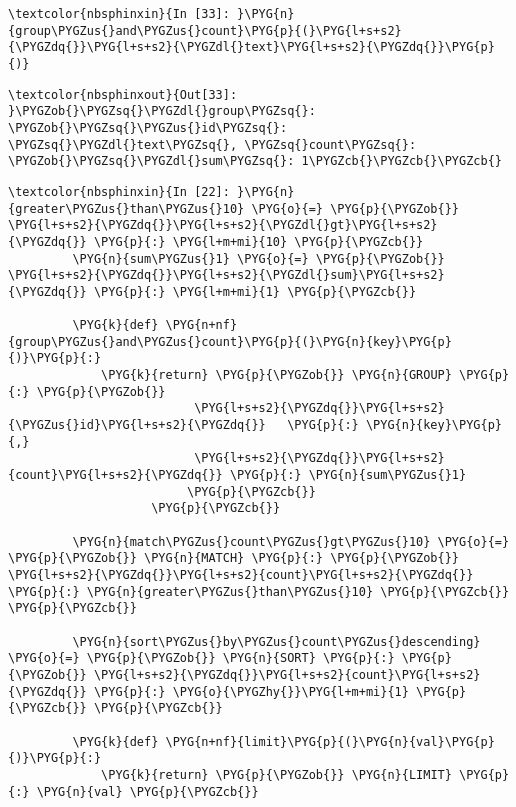 \documentclass[letterpaper,10pt,english]{sphinxmanual}
\begin{document}
%
\begin{Verbatim}[commandchars=\\\{\}]
\textcolor{nbsphinxin}{In [33]: }\PYG{n}{group\PYGZus{}and\PYGZus{}count}\PYG{p}{(}\PYG{l+s+s2}{\PYGZdq{}}\PYG{l+s+s2}{\PYGZdl{}text}\PYG{l+s+s2}{\PYGZdq{}}\PYG{p}{)}
\end{Verbatim}

%
\begin{Verbatim}[commandchars=\\\{\}]
\textcolor{nbsphinxout}{Out[33]: }\PYGZob{}\PYGZsq{}\PYGZdl{}group\PYGZsq{}: \PYGZob{}\PYGZsq{}\PYGZus{}id\PYGZsq{}: \PYGZsq{}\PYGZdl{}text\PYGZsq{}, \PYGZsq{}count\PYGZsq{}: \PYGZob{}\PYGZsq{}\PYGZdl{}sum\PYGZsq{}: 1\PYGZcb{}\PYGZcb{}\PYGZcb{}
\end{Verbatim}

%
\begin{Verbatim}[commandchars=\\\{\}]
\textcolor{nbsphinxin}{In [22]: }\PYG{n}{greater\PYGZus{}than\PYGZus{}10} \PYG{o}{=} \PYG{p}{\PYGZob{}} \PYG{l+s+s2}{\PYGZdq{}}\PYG{l+s+s2}{\PYGZdl{}gt}\PYG{l+s+s2}{\PYGZdq{}} \PYG{p}{:} \PYG{l+m+mi}{10} \PYG{p}{\PYGZcb{}}
         \PYG{n}{sum\PYGZus{}1} \PYG{o}{=} \PYG{p}{\PYGZob{}} \PYG{l+s+s2}{\PYGZdq{}}\PYG{l+s+s2}{\PYGZdl{}sum}\PYG{l+s+s2}{\PYGZdq{}} \PYG{p}{:} \PYG{l+m+mi}{1} \PYG{p}{\PYGZcb{}}
         
         \PYG{k}{def} \PYG{n+nf}{group\PYGZus{}and\PYGZus{}count}\PYG{p}{(}\PYG{n}{key}\PYG{p}{)}\PYG{p}{:}
             \PYG{k}{return} \PYG{p}{\PYGZob{}} \PYG{n}{GROUP} \PYG{p}{:} \PYG{p}{\PYGZob{}}
                          \PYG{l+s+s2}{\PYGZdq{}}\PYG{l+s+s2}{\PYGZus{}id}\PYG{l+s+s2}{\PYGZdq{}}   \PYG{p}{:} \PYG{n}{key}\PYG{p}{,}
                          \PYG{l+s+s2}{\PYGZdq{}}\PYG{l+s+s2}{count}\PYG{l+s+s2}{\PYGZdq{}} \PYG{p}{:} \PYG{n}{sum\PYGZus{}1}
                         \PYG{p}{\PYGZcb{}}
                    \PYG{p}{\PYGZcb{}}
         
         \PYG{n}{match\PYGZus{}count\PYGZus{}gt\PYGZus{}10} \PYG{o}{=} \PYG{p}{\PYGZob{}} \PYG{n}{MATCH} \PYG{p}{:} \PYG{p}{\PYGZob{}} \PYG{l+s+s2}{\PYGZdq{}}\PYG{l+s+s2}{count}\PYG{l+s+s2}{\PYGZdq{}} \PYG{p}{:} \PYG{n}{greater\PYGZus{}than\PYGZus{}10} \PYG{p}{\PYGZcb{}} \PYG{p}{\PYGZcb{}}
         
         \PYG{n}{sort\PYGZus{}by\PYGZus{}count\PYGZus{}descending} \PYG{o}{=} \PYG{p}{\PYGZob{}} \PYG{n}{SORT} \PYG{p}{:} \PYG{p}{\PYGZob{}} \PYG{l+s+s2}{\PYGZdq{}}\PYG{l+s+s2}{count}\PYG{l+s+s2}{\PYGZdq{}} \PYG{p}{:} \PYG{o}{\PYGZhy{}}\PYG{l+m+mi}{1} \PYG{p}{\PYGZcb{}} \PYG{p}{\PYGZcb{}}
         
         \PYG{k}{def} \PYG{n+nf}{limit}\PYG{p}{(}\PYG{n}{val}\PYG{p}{)}\PYG{p}{:}
             \PYG{k}{return} \PYG{p}{\PYGZob{}} \PYG{n}{LIMIT} \PYG{p}{:} \PYG{n}{val} \PYG{p}{\PYGZcb{}}
\end{Verbatim}
\end{document}
